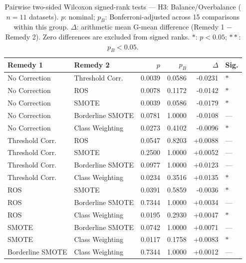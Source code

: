 \begin{table}[ht]
\centering
\scriptsize
\caption{Pairwise two-sided Wilcoxon signed-rank tests --- H3: Balance/Overbalance ($n=11$ datasets). $p$: nominal; $p_B$: Bonferroni-adjusted across 15 comparisons within this group. $\Delta$: arithmetic mean G-mean difference (Remedy 1 $-$ Remedy 2). Zero differences are excluded from signed ranks. $\ast$: $p<0.05$; $\ast\ast$: $p_B<0.05$.}
\label{tab:wilcoxon_h3}
\begin{tabular}{llrrrl}
\toprule
\textbf{Remedy 1} & \textbf{Remedy 2} & \textbf{$p$} & \textbf{$p_B$} & \textbf{$\Delta$} & \textbf{Sig.} \\
\midrule
    No Correction & Threshold Corr. & 0.0039 & 0.0586 & -0.0231 & $\ast$ \\
    No Correction & ROS & 0.0078 & 0.1172 & -0.0142 & $\ast$ \\
    No Correction & SMOTE & 0.0039 & 0.0586 & -0.0179 & $\ast$ \\
    No Correction & Borderline SMOTE & 0.0781 & 1.0000 & -0.0108 & --- \\
    No Correction & Class Weighting & 0.0273 & 0.4102 & -0.0096 & $\ast$ \\
    Threshold Corr. & ROS & 0.0547 & 0.8203 & +0.0088 & --- \\
    Threshold Corr. & SMOTE & 0.2500 & 1.0000 & +0.0052 & --- \\
    Threshold Corr. & Borderline SMOTE & 0.0977 & 1.0000 & +0.0123 & --- \\
    Threshold Corr. & Class Weighting & 0.0234 & 0.3516 & +0.0135 & $\ast$ \\
    ROS & SMOTE & 0.0391 & 0.5859 & -0.0036 & $\ast$ \\
    ROS & Borderline SMOTE & 0.7344 & 1.0000 & +0.0034 & --- \\
    ROS & Class Weighting & 0.0195 & 0.2930 & +0.0047 & $\ast$ \\
    SMOTE & Borderline SMOTE & 0.0742 & 1.0000 & +0.0071 & --- \\
    SMOTE & Class Weighting & 0.0117 & 0.1758 & +0.0083 & $\ast$ \\
    Borderline SMOTE & Class Weighting & 0.7344 & 1.0000 & +0.0012 & --- \\
\bottomrule
\end{tabular}
\end{table}